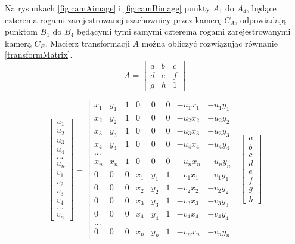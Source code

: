 Na rysunkach \ref{fig:camAimage} i \ref{fig:camBimage} punkty $A_1$ do $A_4$, będące czterema rogami zarejestrowanej szachownicy przez kamerę $C_A$, odpowiadają punktom $B_1$ do $B_4$ będącymi tymi samymi czterema rogami zarejestrowanymi kamerą $C_B$. Macierz transformacji $A$ można obliczyć rozwiązując równanie \eqref{transformMatrix}.
\begin{equation}
\label{transformMatrix}
A = \begin{bmatrix}
a & b & c\\ 
d & e & f\\ 
g & h & 1
\end{bmatrix}
\end{equation}

\begin{equation}
\begin{bmatrix}
u_1\\ 
u_2\\ 
u_3\\ 
u_4\\
...\\ 
u_n\\ 
v_1\\ 
v_2\\ 
v_3\\ 
v_4\\ 
...\\ 
v_n 

\end{bmatrix}
=
\begin{bmatrix}
x_1 & y_1 & 1 & 0 & 0 & 0 & -u_1x_1 & -u_1y_1\\ 
x_2 & y_2 & 1 & 0 & 0 & 0 & -u_2x_2 & -u_2y_2\\ 
x_3 & y_3 & 1 & 0 & 0 & 0 & -u_3x_3 & -u_3y_3\\ 
x_4 & y_4 & 1 & 0 & 0 & 0 & -u_4x_4 & -u_4y_4\\ 
...\\ 
x_n & x_n & 1 & 0 & 0 & 0 & -u_nx_n & -u_ny_n\\ 
0 & 0 & 0 & x_1 & y_1 & 1 & -v_1x_1 & -v_1y_1\\ 
0 & 0 & 0 & x_2 & y_2 & 1 & -v_2x_2 & -v_2y_2\\  
0 & 0 & 0 & x_3 & y_3 & 1 & -v_3x_3 & -v_3y_3\\ 
0 & 0 & 0 & x_4 & y_4 & 1 & -v_4x_4 & -v_4y_4\\ 
...\\ 
0 & 0 & 0 & x_n & y_n & 1 & -v_nx_n & -v_ny_n
\end{bmatrix}
\begin{bmatrix}
a \\
b\\
c\\
d \\
e\\
f\\
g\\
h
\end{bmatrix}
\end{equation}

